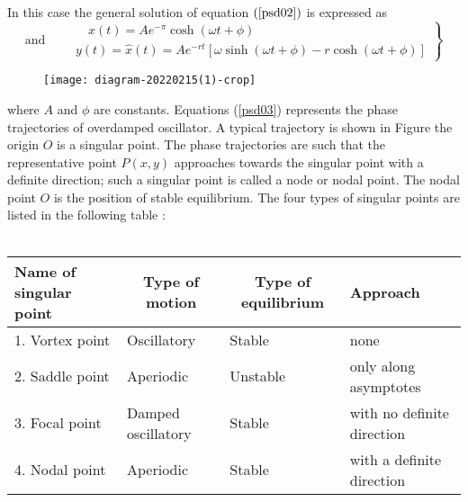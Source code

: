 In this case the general solution of equation $(\ref{psd02})$ is expressed as \\
\begin{equation}
\text{and}\qquad
\left.\begin{array}{l}
\quad x(t)=A e^{-\pi} \cosh (\omega t+\phi) \\
y(t)=\hat{x}(t)=A e^{-r t}[\omega \sinh (\omega t+\phi)-r \cosh (\omega t+\phi)]
\end{array}\right\}\label{psd03}
\end{equation}
\begin{figure}[H]
	\centering
	\texttt{[image: diagram-20220215(1)-crop]}
	\caption{}
	\label{}
\end{figure}
where $A$ and $\phi$ are constants. Equations (\ref{psd03}) represents the phase trajectories of overdamped oscillator. A typical trajectory is shown in Figure  the origin $O$ is a singular point. The phase trajectories are such that the representative point $P(x, y)$ approaches towards the singular point with a definite direction; such a singular point is called a node or nodal point. The nodal point $O$ is the position of stable equilibrium. The four types of singular points are listed in the following table :\\\\
\begin{tabular}{|l|l|l|l|}
	\hline Name of singular point & \multicolumn{1}{|c|}{ Type of motion } & \multicolumn{1}{|c|}{ Type of equilibrium } & Approach \\
	\hline 1. Vortex point & Oscillatory & Stable & none \\
	\hline 2. Saddle point & Aperiodic & Unstable & only along asymptotes \\
	\hline 3. Focal point & Damped oscillatory & Stable & with no definite direction \\
	\hline 4. Nodal point & Aperiodic & Stable & with a definite direction \\
	\hline
\end{tabular}
